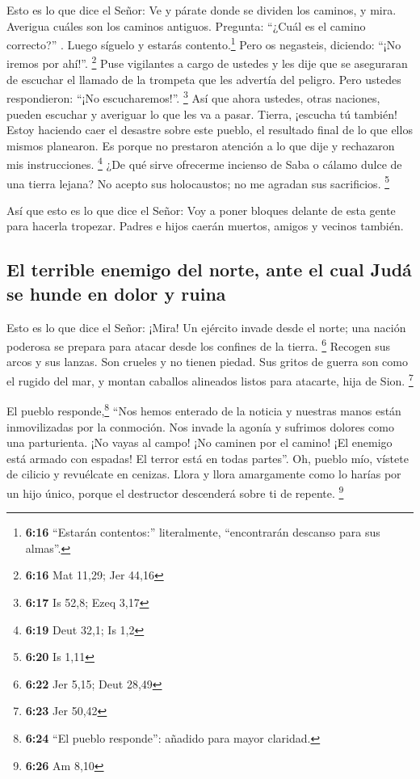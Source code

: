  Esto es lo que dice el Señor: Ve y párate donde se
dividen los caminos, y mira. Averigua cuáles son los caminos antiguos.
Pregunta: ``¿Cuál es el camino correcto?'' . Luego síguelo y estarás
contento.\footnote{\textbf{6:16} ``Estarán contentos:'' literalmente,
  ``encontrarán descanso para sus almas''.} Pero os negasteis, diciendo:
``¡No iremos por ahí!''. \footnote{\textbf{6:16} Mat 11,29; Jer 44,16}
 Puse vigilantes a cargo de ustedes y les dije que se
aseguraran de escuchar el llamado de la trompeta que les advertía del
peligro. Pero ustedes respondieron: ``¡No escucharemos!''. \footnote{\textbf{6:17}
  Is 52,8; Ezeq 3,17}  Así que ahora ustedes, otras
naciones, pueden escuchar y averiguar lo que les va a pasar.
 Tierra, ¡escucha tú también! Estoy haciendo caer el
desastre sobre este pueblo, el resultado final de lo que ellos mismos
planearon. Es porque no prestaron atención a lo que dije y rechazaron
mis instrucciones. \footnote{\textbf{6:19} Deut 32,1; Is 1,2}
 ¿De qué sirve ofrecerme incienso de Saba o cálamo dulce
de una tierra lejana? No acepto sus holocaustos; no me agradan sus
sacrificios. \footnote{\textbf{6:20} Is 1,11}

 Así que esto es lo que dice el Señor: Voy a poner
bloques delante de esta gente para hacerla tropezar. Padres e hijos
caerán muertos, amigos y vecinos también.

\hypertarget{el-terrible-enemigo-del-norte-ante-el-cual-juduxe1-se-hunde-en-dolor-y-ruina}{%
\subsection{El terrible enemigo del norte, ante el cual Judá se hunde en
dolor y
ruina}\label{el-terrible-enemigo-del-norte-ante-el-cual-juduxe1-se-hunde-en-dolor-y-ruina}}

 Esto es lo que dice el Señor: ¡Mira! Un ejército invade
desde el norte; una nación poderosa se prepara para atacar desde los
confines de la tierra. \footnote{\textbf{6:22} Jer 5,15; Deut 28,49}
 Recogen sus arcos y sus lanzas. Son crueles y no tienen
piedad. Sus gritos de guerra son como el rugido del mar, y montan
caballos alineados listos para atacarte, hija de Sion. \footnote{\textbf{6:23}
  Jer 50,42}

 El pueblo responde,\footnote{\textbf{6:24} ``El pueblo
  responde'': añadido para mayor claridad.} ``Nos hemos enterado de la
noticia y nuestras manos están inmovilizadas por la conmoción. Nos
invade la agonía y sufrimos dolores como una parturienta.
 ¡No vayas al campo! ¡No caminen por el camino! ¡El
enemigo está armado con espadas! El terror está en todas partes''.
 Oh, pueblo mío, vístete de cilicio y revuélcate en
cenizas. Llora y llora amargamente como lo harías por un hijo único,
porque el destructor descenderá sobre ti de repente. \footnote{\textbf{6:26}
  Am 8,10}

